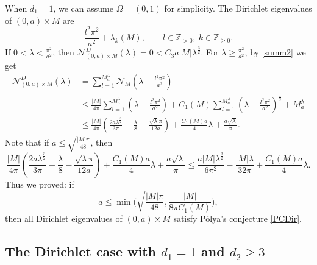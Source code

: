 \documentclass[11pt,letterpaper]{amsart}
\numberwithin{equation}{section}
\theoremstyle{plain}
\theoremstyle{plain}
\numberwithin{equation}{section}
\theoremstyle{remark}
\begin{document}
	When $d_1=1$, we can assume $\Omega=(0,1)$ for simplicity. The Dirichlet eigenvalues of $(0,a)\times M$ are
	\[
	\frac{l^2 \pi^2}{a^2}+ \lambda_k(M), \qquad l\in \mathbb Z_{>0},\ k\in \mathbb Z_{\ge 0}.
	\]
	If $0<\lambda<\frac{\pi^2}{a^2}$, then $\mathcal N^D_{(0,a)\times M}(\lambda)=0< C_3 a|M|\lambda^{\frac{3}{2}}$. For $\lambda\ge \frac{\pi^2}{a^2}$, by \eqref{summ2} we get 
	\[
	\begin{aligned}
		\mathcal N^D_{(0,a)\times M}(\lambda)
		&= \sum_{l=1}^{M^\lambda_a}\mathcal N_M(\lambda-\frac{l^2\pi^2}{a^2}) \\
		&\le \frac{|M|}{4\pi}\sum_{l=1}^{M^\lambda_a} (\lambda-\frac{l^2\pi^2}{a^2}) +C_1(M) \sum_{l=1}^{M^\lambda_a} (\lambda-\frac{l^2\pi^2}{a^2})^{\frac{1}{2}}+ M^\lambda_a
		\\
		&\le \frac{|M|}{4\pi}(\frac{2a\lambda^{\frac{3}{2}}}{3\pi}-\frac{\lambda}{8}- \frac{\sqrt \lambda \pi}{12 a})+\frac{C_1(M)a}{4}\lambda+ \frac{a\sqrt\lambda}{\pi}.
	\end{aligned}
	\]		
	Note that if $a\le \sqrt{\frac{|M|\pi}{48}}$, then 
	\[ 
	\frac{|M|}{4\pi}(\frac{2a\lambda^{\frac{3}{2}}}{3\pi}-\frac{\lambda}{8}- \frac{\sqrt \lambda \pi}{12 a})+\frac{C_1(M)a}{4}\lambda+ \frac{a\sqrt\lambda}{\pi}  
	\le \frac{a|M|\lambda^{\frac{3}{2}}}{6\pi^2}-\frac{|M| \lambda}{32 \pi}+\frac{C_1(M)a}{4}\lambda. 
	\]
	Thus we proved: if 
	\begin{equation}\label{Diri12}
		a \le \min\big(\sqrt{\frac{|M|\pi}{48}}, \frac{|M|}{8\pi C_1(M)}\big), 
	\end{equation}
	then all Dirichlet eigenvalues of $(0,a)\times M$ satisfy P\'olya's conjecture \eqref{PCDir}.
	
	
	\subsection{The Dirichlet case with $d_1=1$ and $d_2\ge 3$}
	
\end{document}
